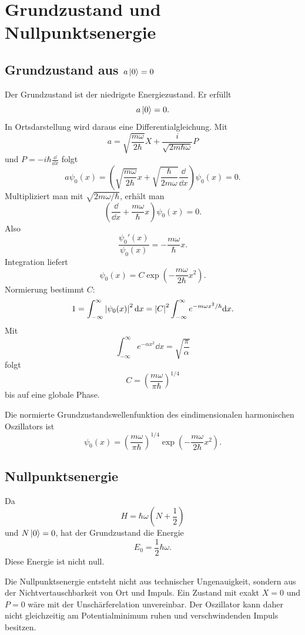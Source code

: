 \section{Grundzustand und Nullpunktsenergie}

\subsection{Grundzustand aus $a\left|0\right\rangle=0$}

Der Grundzustand ist der niedrigste Energiezustand. Er erfüllt
\[
    a\left|0\right\rangle=0.
\]
In Ortsdarstellung wird daraus eine Differentialgleichung. Mit
\[
    a=\sqrt{\frac{m\omega}{2\hbar}}X+\frac{i}{\sqrt{2m\hbar\omega}}P
\]
und $P=-i\hbar\frac{\dd}{\dd x}$ folgt
\[
    a\psi_0(x)=\left(\sqrt{\frac{m\omega}{2\hbar}}x+\sqrt{\frac{\hbar}{2m\omega}}\frac{\dd}{\dd x}\right)\psi_0(x)=0.
\]
Multipliziert man mit $\sqrt{2m\omega/\hbar}$, erhält man
\[
    \left(\frac{\dd}{\dd x}+\frac{m\omega}{\hbar}x\right)\psi_0(x)=0.
\]
Also
\[
    \frac{\psi_0'(x)}{\psi_0(x)}=-\frac{m\omega}{\hbar}x.
\]
Integration liefert
\[
    \psi_0(x)=C\exp\left(-\frac{m\omega}{2\hbar}x^2\right).
\]
Normierung bestimmt $C$:
\[
    1=\int_{-\infty}^{\infty}\left| \psi_0(x) \right|^2\mathrm{d} x
    =\left| C \right|^2\int_{-\infty}^{\infty}e^{-m\omega x^2/\hbar}\mathrm{d} x.
\]
Mit
\[
    \int_{-\infty}^{\infty}e^{-\alpha x^2}\dd x=\sqrt{\frac{\pi}{\alpha}}
\]
folgt
\[
    C=\left(\frac{m\omega}{\pi\hbar}\right)^{1/4}
\]
bis auf eine globale Phase.

\begin{formulabox}
Die normierte Grundzustandswellenfunktion des eindimensionalen harmonischen Oszillators ist
\[
    \psi_0(x)=\left(\frac{m\omega}{\pi\hbar}\right)^{1/4}
    \exp\left(-\frac{m\omega}{2\hbar}x^2\right).
\]
\end{formulabox}

\subsection{Nullpunktsenergie}

Da
\[
    H=\hbar\omega\left(N+\frac12\right)
\]
und $N\left|0\right\rangle=0$, hat der Grundzustand die Energie
\[
    E_0=\frac12\hbar\omega.
\]
Diese Energie ist nicht null.

\begin{conceptbox}
Die Nullpunktsenergie entsteht nicht aus technischer Ungenauigkeit, sondern aus der Nichtvertauschbarkeit von Ort und Impuls. Ein Zustand mit exakt $X=0$ und $P=0$ wäre mit der Unschärferelation unvereinbar. Der Oszillator kann daher nicht gleichzeitig am Potentialminimum ruhen und verschwindenden Impuls besitzen.
\end{conceptbox}

